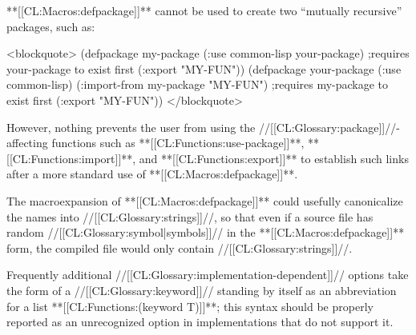 **[[CL:Macros:defpackage]]** cannot be used to create two ``mutually recursive'' packages, such as:

<blockquote> (defpackage my-package (:use common-lisp your-package) ;requires your-package to exist first (:export "MY-FUN")) (defpackage your-package (:use common-lisp) (:import-from my-package "MY-FUN") ;requires my-package to exist first (:export "MY-FUN")) </blockquote>

However, nothing prevents the user from using the //[[CL:Glossary:package]]//-affecting functions such as **[[CL:Functions:use-package]]**, **[[CL:Functions:import]]**, and **[[CL:Functions:export]]** to establish such links after a more standard use of **[[CL:Macros:defpackage]]**.

The macroexpansion of **[[CL:Macros:defpackage]]** could usefully canonicalize the names into //[[CL:Glossary:strings]]//, so that even if a source file has random //[[CL:Glossary:symbol|symbols]]// in the **[[CL:Macros:defpackage]]** form, the compiled file would only contain //[[CL:Glossary:strings]]//.

Frequently additional //[[CL:Glossary:implementation-dependent]]// options take the form of a //[[CL:Glossary:keyword]]// standing by itself as an abbreviation for a list **[[CL:Functions:(keyword T)]]**; this syntax should be properly reported as an unrecognized option in implementations that do not support it.


     
